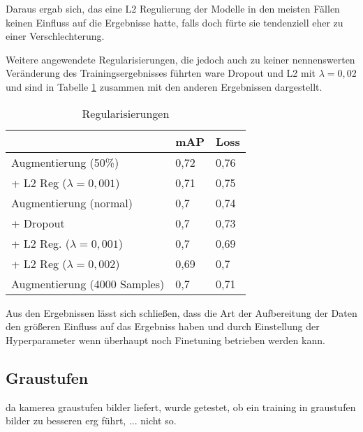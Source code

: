 Daraus ergab sich, das eine L2 Regulierung der Modelle 
in den meisten Fällen keinen Einfluss auf die Ergebnisse hatte,
falls doch fürte sie tendenziell eher zu einer Verschlechterung.


Weitere angewendete Regularisierungen, die jedoch 
auch zu keiner nennenswerten Veränderung des Trainingsergebnisses 
führten ware Dropout und L2 mit $\lambda = 0,02$ und sind in 
Tabelle \ref{table:reg} zusammen mit den anderen Ergebnissen dargestellt.

\vspace{1cm}
\begin{table}[htb]
  \centering
  \label{table:reg}
  \begin{tabular}{m{}|m{}<{\centering}m{}<{\centering}}
  \hline
                    & mAP  & Loss  \\ \hline\hline
  Augmentierung (50\%) &  0,72    &    0,76   \\
   + L2 Reg ($\lambda = 0,001$)            &   0,71     & 0,75       \\\hline
  Augmentierung (normal)     & 0,7  & 0,74            \\
  + Dropout          & 0,7  & 0,73            \\
  + L2 Reg. ($\lambda = 0,001$)    & 0,7  & 0,69            \\
  + L2 Reg ($\lambda = 0,002$)    & 0,69 & 0,7             \\ \hline
  Augmentierung (4000 Samples) &0,7&0,71\\\hline
  \end{tabular}
  \caption{Regularisierungen}
\end{table}
\vspace{1cm}


Aus den Ergebnissen lässt sich schließen, dass die Art
der Aufbereitung der Daten den größeren Einfluss auf das Ergebniss haben
und durch Einstellung der Hyperparameter wenn überhaupt 
noch Finetuning betrieben werden kann.





\subsection{Graustufen}
da kamerea graustufen bilder liefert, wurde getestet, ob ein 
training in graustufen bilder zu besseren erg führt, ... nicht so.




